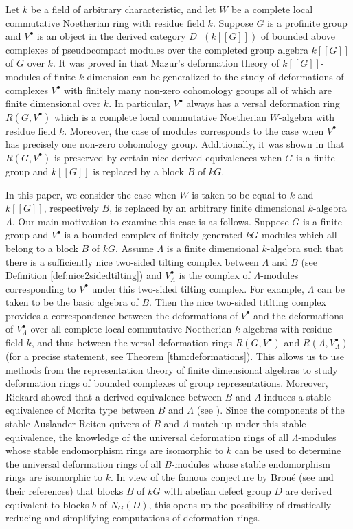\documentclass{amsart}
\theoremstyle{plain}
\theoremstyle{definition}
\theoremstyle{remark}
\begin{document}
Let $k$ be a field of arbitrary characteristic, and let $W$ be a complete local commutative
Noetherian ring with residue field $k$. Suppose $G$ is a profinite group and $V^\bullet$ is an
object in the derived category $D^-(k[[G]])$ of bounded above complexes of pseudocompact modules 
over the completed group algebra $k[[G]]$ of $G$ over $k$. It was proved in \cite{comptes,bcderived}
that Mazur's deformation theory of  $k[[G]]$-modules of finite $k$-dimension can be generalized to the study of 
deformations of complexes $V^\bullet$ with finitely many non-zero cohomology groups all of which are finite dimensional over $k$.
In particular, $V^\bullet$ always has a versal deformation ring $R(G,V^\bullet)$ which is a complete local commutative
Noetherian $W$-algebra with residue field $k$. Moreover, the case of modules corresponds to the case
when $V^\bullet$ has precisely one non-zero cohomology group. Additionally, it was shown in \cite{derivedeq}
that $R(G,V^\bullet)$ is preserved by certain nice derived equivalences when $G$ is a finite group and
$k[[G]]$ is replaced by a block $B$ of $kG$.

In this paper, we consider the case when $W$ is taken to be equal to $k$ and $k[[G]]$, respectively $B$, is replaced by an
arbitrary finite dimensional $k$-algebra $\Lambda$. Our main motivation to examine this case is as follows.
Suppose $G$ is a finite group and $V^\bullet$ is a bounded complex of finitely generated $kG$-modules which all
belong to a block $B$ of $kG$. Assume $\Lambda$ is a finite dimensional $k$-algebra such that there is a 
sufficiently nice two-sided tilting complex between $\Lambda$ and $B$ (see Definition \ref{def:nice2sidedtilting}) 
and $V^\bullet_\Lambda$ is the complex of $\Lambda$-modules corresponding to $V^\bullet$ under this
two-sided tilting complex. For example, $\Lambda$ can be taken to be the basic algebra of $B$.
Then the nice two-sided titlting complex provides a correspondence between the deformations of $V^\bullet$ and
the deformations of $V^\bullet_\Lambda$ over all complete local commutative Noetherian 
$k$-algebras with residue field $k$, and thus
between the versal deformation rings $R(G,V^\bullet)$ and $R(\Lambda,V^\bullet_\Lambda)$ (for a 
precise statement, see Theorem \ref{thm:deformations}). This allows us to use
methods from the representation theory of finite dimensional 
algebras to study deformation rings of bounded complexes of group representations. Moreover,
Rickard showed that a derived equivalence between $B$ and $\Lambda$ induces a 
stable equivalence of Morita type between $B$ and $\Lambda$ (see \cite[Cors. 5.3 and 5.5]{rickard1}). 
Since the components of the stable
Auslander-Reiten quivers of $B$ and $\Lambda$ match up under this stable equivalence, the
knowledge of the universal deformation rings of all $\Lambda$-modules whose stable endomorphism rings
are isomorphic to $k$ can be used to determine the universal deformation rings of all $B$-modules
whose stable endomorphism rings are isomorphic to $k$. In view of the famous conjecture by Brou\'{e} 
(see \cite{broue,rickardICM} and their references) that
blocks $B$ of $kG$ with abelian defect group $D$ are derived equivalent to blocks $b$ of $N_G(D)$,
this opens up the possibility of drastically reducing and simplifying computations of deformation rings.
\end{document}
